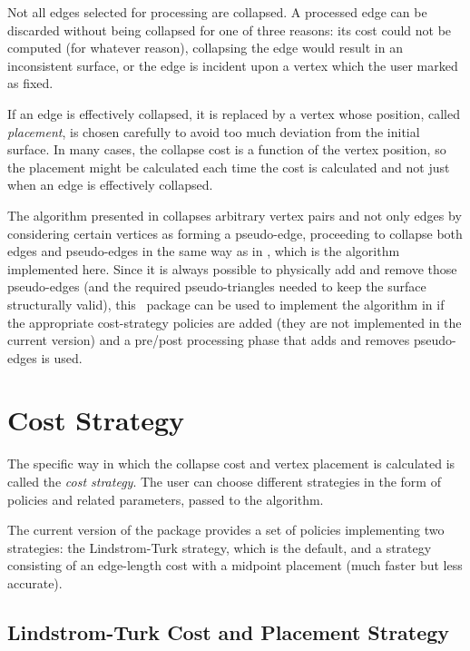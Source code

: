 Not all edges selected for processing are collapsed. A processed edge can be discarded 
without being collapsed for one of three reasons: its cost could not be computed 
(for whatever reason), collapsing the edge would result in an inconsistent surface, 
or the edge is incident upon a vertex which the user marked as fixed.

If an edge is effectively collapsed, it is replaced by a vertex whose position, called 
{\em placement}, is chosen carefully to avoid too much deviation from the initial 
surface. In many cases, the collapse cost is a function of the vertex position, so the 
placement might be calculated each time the cost is calculated and not just when an 
edge is effectively collapsed.

The algorithm presented in \cite{gh-ssqem-97} collapses arbitrary vertex pairs and not 
only edges by considering certain vertices as forming a pseudo-edge, proceeding to collapse
both edges and pseudo-edges in the same way as in \cite{cgal:lt-fmeps-98,cgal:lt-ems-99}, 
which is the algorithm implemented here. Since it is always possible to physically add and 
remove those pseudo-edges (and the required pseudo-triangles needed to keep the surface 
structurally valid), this \cgal\ package can be used to implement the algorithm
in \cite{gh-ssqem-97} if the appropriate cost-strategy policies are added 
(they are not implemented in the current version) and a pre/post processing phase that
adds and removes pseudo-edges is used.

\section{Cost Strategy}

The specific way in which the collapse cost and vertex placement is
calculated is called the {\em cost strategy}. The user can choose 
different strategies in the form of policies and related parameters,
passed to the algorithm.
 
The current version of the package provides a set of policies implementing
two strategies: the Lindstrom-Turk strategy, which is the default, and 
a strategy consisting of an edge-length cost with a midpoint placement 
(much faster but less accurate).

\subsection{Lindstrom-Turk Cost and Placement Strategy\label{SurfaceMeshSimplification:LindstromTurkStrategy}}

